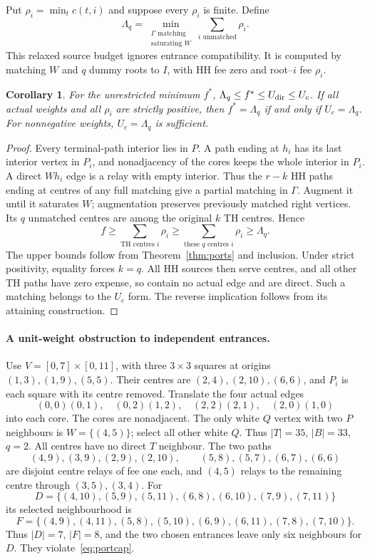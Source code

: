 \documentclass[11pt]{article}
\newtheorem{corollary}[theorem]{Corollary}
\begin{document}
Put $\rho_i=\min_t c(t,i)$ and suppose every $\rho_i$ is finite. Define
\[
 \Lambda_q=\min_{\substack{\Gamma\text{ matching}\\\text{saturating }W}}
                  \sum_{i\text{ unmatched}}\rho_i.
\]
This relaxed source budget ignores entrance compatibility. It is computed
by matching $W$ and $q$ dummy roots to $I$, with HH fee zero and
root--$i$ fee $\rho_i$.

\begin{corollary}\label{cor:portbudget}
For the unrestricted minimum $f^*$,
$\Lambda_q\le f^*\le U_{\rm dir}\le U_c$.
If all actual weights and all $\rho_i$ are strictly positive, then
$f^*=\Lambda_q$ if and only if $U_c=\Lambda_q$.
For nonnegative weights, $U_c=\Lambda_q$ is sufficient.
\end{corollary}
\begin{proof}
Every terminal-path interior lies in $P$. A path ending at $h_i$ has its
last interior vertex in $P_i$, and nonadjacency of the cores keeps the
whole interior in $P_i$. A direct $Wh_i$ edge is a relay with empty
interior. Thus the $r-k$ HH paths ending at centres of any full matching
give a partial matching in $\Gamma$. Augment it until it saturates $W$; augmentation
preserves previously matched right vertices. Its $q$ unmatched centres
are among the original $k$ TH centres. Hence
\[
 f\ge\sum_{\text{TH centres }i}\rho_i
   \ge\sum_{\text{these }q\text{ centres }i}\rho_i\ge\Lambda_q.
\]
The upper bounds follow from Theorem~\ref{thm:ports} and inclusion.
Under strict positivity, equality forces $k=q$. All HH sources then
serve centres, and all other TH paths have zero expense, so contain no
actual edge and are direct. Such a matching belongs to the $U_c$ form.
The reverse implication follows from its attaining construction.
\end{proof}

\paragraph{A unit-weight obstruction to independent entrances.}
Use $V=[0,7]\times[0,11]$, with three $3\times3$ squares at origins
$(1,3),(1,9),(5,5)$. Their centres are $(2,4),(2,10),(6,6)$, and $P_i$
is each square with its centre removed. Translate the four actual edges
\[
 (0,0)(0,1),\quad(0,2)(1,2),\quad(2,2)(2,1),\quad(2,0)(1,0)
\]
into each core. The cores are nonadjacent. The only white $Q$ vertex
with two $P$ neighbours is $W=\{(4,5)\}$; select all other white $Q$.
Thus $|T|=35$, $|B|=33$, $q=2$. All centres have no direct $T$ neighbour.
The two paths
\[
 (4,9),(3,9),(2,9),(2,10),\qquad
 (5,8),(5,7),(6,7),(6,6)
\]
are disjoint centre relays of fee one each, and $(4,5)$ relays to the
remaining centre through $(3,5),(3,4)$. For
\[
 D=\{(4,10),(5,9),(5,11),(6,8),(6,10),(7,9),(7,11)\}
\]
its selected neighbourhood is
\[
 F=\{(4,9),(4,11),(5,8),(5,10),(6,9),(6,11),(7,8),(7,10)\}.
\]
Thus $|D|=7$, $|F|=8$, and the two chosen entrances leave only six
neighbours for $D$. They violate~\eqref{eq:portcap}.
\end{document}
